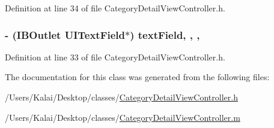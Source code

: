 Definition at line 34 of file Category\-Detail\-View\-Controller.\-h.

\hypertarget{interface_category_detail_view_controller_ad6a7d0592784bdfe80188a3f14a18163}{
\subsubsection[{text\-Field}]{\setlength{\rightskip}{0pt plus 5cm}-\/ (I\-B\-Outlet U\-I\-Text\-Field$\ast$) text\-Field\hspace{0.3cm}{\ttfamily [read]}, {\ttfamily [write]}, {\ttfamily [nonatomic]}, {\ttfamily [strong]}}}\label{interface_category_detail_view_controller_ad6a7d0592784bdfe80188a3f14a18163}


Definition at line 33 of file Category\-Detail\-View\-Controller.\-h.



The documentation for this class was generated from the following files\-:\begin{DoxyCompactItemize}
\item 
/\-Users/\-Kalai/\-Desktop/classes/\hyperlink{_category_detail_view_controller_8h}{Category\-Detail\-View\-Controller.\-h}\item 
/\-Users/\-Kalai/\-Desktop/classes/\hyperlink{_category_detail_view_controller_8m}{Category\-Detail\-View\-Controller.\-m}\end{DoxyCompactItemize}
